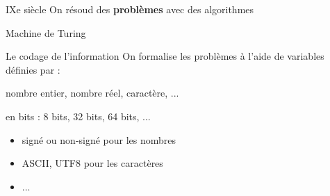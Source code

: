 \begin{frame}{IXe siècle}
    On résoud des \textbf{problèmes} avec des algorithmes
\end{frame}

\begin{frame}{Machine de Turing}
\end{frame}

\begin{frame}{Le codage de l'information}
    On formalise les problèmes à l'aide de variables définies par :
    \begin{description}[<+->]
        \item [Le TYPE] nombre entier, nombre réel, caractère, ...
        \item [La TAILLE] en bits : 8 bits, 32 bits, 64 bits, ...
        \item [Le CODAGE] 
        \begin{itemize}
            \item signé ou non-signé pour les nombres
            \item ASCII, UTF8 pour les caractères
            \item ...
        \end{itemize}
    \end{description}
\end{frame}

